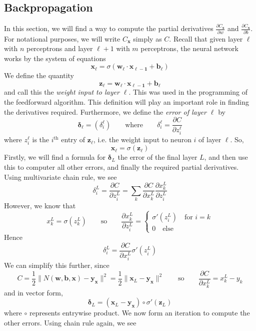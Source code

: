 \documentclass[10pt]{article}
\begin{document}
\subsection{Backpropagation}
In this section, we will find a way to compute the partial derivatives $\frac{\partial C_{\mathbf{x}}}{\partial w}$ and $\frac{\partial C_{\mathbf{x}}}{\partial b}$. For notational purposes, we will write $C_{\mathbf{x}}$ simply as $C$.
Recall that given layer $\ell$ with $n$ perceptrons and layer $\ell+1$ with $m$ perceptrons, the neural network works by the system of equations
\[
\mathbf{x}_{\ell} = \sigma\left(\mathbf{w}_{\ell} \cdot \mathbf{x_{\ell - 1}} + \mathbf{b}_{\ell} \right)
\]
We define the quantity
\[
\mathbf{z}_{\ell} = \mathbf{w}_{\ell} \cdot \mathbf{x_{\ell - 1}} + \mathbf{b}_{\ell}
\]
and call this the \textit{weight input to layer $\ell$}. This was used in the programming of the feedforward algorithm. This definition will play an important role in finding the derivatives required. Furthermore, we define the \textit{error of layer $\ell$} by
\[
\boldsymbol{\delta}_{\ell} = \left( \delta^{\ell}_i \right) \qquad \text{where} \qquad \delta^{\ell}_i = \frac{\partial C}{\partial z^{\ell}_i}
\]
where $z^{\ell}_i$ is the $i^{\text{th}}$ entry of $\mathbf{z}_{\ell}$, i.e. the weight input to neuron $i$ of layer $\ell$. So, 
\[
\mathbf{x}_{\ell} = \sigma\left(\mathbf{z}_{\ell} \right)
\]
Firstly, we will find a formula for $\boldsymbol{\delta}_L$ the error of the final layer $L$, and then use this to computer all other errors, and finally the required partial derivatives. Using multivariate chain rule, we see
\[
\delta^{L}_i = \frac{\partial C}{\partial z^{L}_i} = \sum_{k} \frac{\partial C}{\partial x^{L}_k} \frac{\partial x^{L}_k}{\partial z^{L}_i}
\]
However, we know that
\[
x^{L}_k = \sigma\left(z^{L}_k\right) \qquad \text{so} \qquad \frac{\partial x^{L}_k}{\partial z^{L}_i} = \begin{cases}
\sigma'\left(z^{L}_i\right) \quad \text{for } i=k\\
0 \quad \text{else}
\end{cases}
\]
Hence
\[
\delta^{L}_i = \frac{\partial C}{\partial x^{L}_i} \sigma'\left(z^{L}_i\right)
\]
We can simplify this further, since
\[
C = \frac{1}{2}\lVert N(\mathbf{w},\mathbf{b},\mathbf{x}) - \mathbf{y_x}\rVert ^2 = \frac{1}{2}\lVert \mathbf{x}_{L} - \mathbf{y_x}\rVert ^2
\qquad
\text{so}
\qquad
\frac{\partial C}{\partial x^{L}_k} = x^{L}_k - y_{k}
\]
and in vector form,
\[
\boldsymbol{\delta}_L = (\mathbf{x}_{L} - \mathbf{y_x}) \circ \sigma'(\mathbf{z}_L)
\]
where $\circ$ represents entrywise product. We now form an iteration to compute the other errors. Using chain rule again, we see
\end{document}

